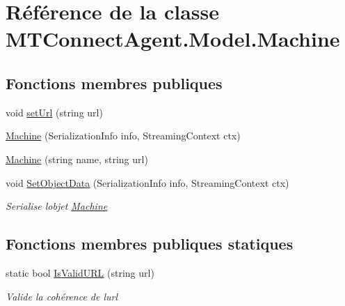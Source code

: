 \hypertarget{class_m_t_connect_agent_1_1_model_1_1_machine}{}\section{Référence de la classe M\+T\+Connect\+Agent.\+Model.\+Machine}
\label{class_m_t_connect_agent_1_1_model_1_1_machine}
\subsection*{Fonctions membres publiques}
\begin{DoxyCompactItemize}
\item 
void \mbox{\hyperlink{class_m_t_connect_agent_1_1_model_1_1_machine_a06ffd7e8b7adb8b7306b0bc2a6662fb9}{set\+Url}} (string url)
\item 
\mbox{\hyperlink{class_m_t_connect_agent_1_1_model_1_1_machine_aa5b3b34432aa1586c337c6b46b17d0d9}{Machine}} (Serialization\+Info info, Streaming\+Context ctx)
\item 
\mbox{\hyperlink{class_m_t_connect_agent_1_1_model_1_1_machine_a2fd689b697c2297a488219ac15765d1b}{Machine}} (string name, string url)
\item 
void \mbox{\hyperlink{class_m_t_connect_agent_1_1_model_1_1_machine_a6fca01ab63360a7ba3ae89772d9e9c48}{Set\+Object\+Data}} (Serialization\+Info info, Streaming\+Context ctx)
\begin{DoxyCompactList}\small\item\em Serialise l\textquotesingle{}objet \mbox{\hyperlink{class_m_t_connect_agent_1_1_model_1_1_machine}{Machine}} \end{DoxyCompactList}\end{DoxyCompactItemize}
\subsection*{Fonctions membres publiques statiques}
\begin{DoxyCompactItemize}
\item 
static bool \mbox{\hyperlink{class_m_t_connect_agent_1_1_model_1_1_machine_a472dfc91f16a8c67dd05d625afeb1ff0}{Is\+Valid\+U\+RL}} (string url)
\begin{DoxyCompactList}\small\item\em Valide la cohérence de l\textquotesingle{}url\end{DoxyCompactList}\end{DoxyCompactItemize}
